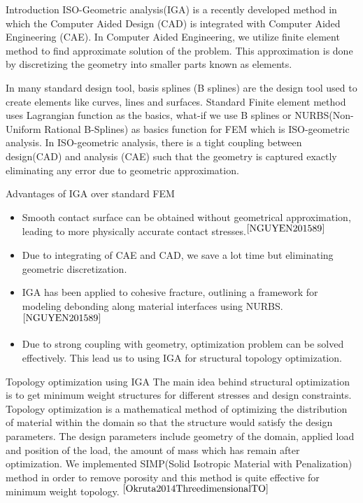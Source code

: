 \documentclass[a4paper,12pt,times]{article}
\begin{document}



\tableofcontents
\vfill
\newpage
\begin{section}{Introduction}
ISO-Geometric analysis(IGA) is a recently developed method in which the Computer Aided Design (CAD) is integrated with Computer Aided Engineering (CAE). In Computer Aided Engineering, we utilize finite element method to find approximate solution of the problem. This approximation is done by discretizing the geometry into smaller parts known as elements.

In many standard design tool, basis splines (B splines) are the design tool used to create elements like curves, lines and surfaces. Standard Finite element method uses Lagrangian function as the basics, what-if we use B splines or NURBS(Non-Uniform Rational B-Splines) as basics function for FEM which is ISO-geometric analysis. In ISO-geometric analysis, there is a tight coupling between design(CAD) and analysis (CAE) such that the geometry is captured exactly eliminating any error due to geometric approximation. 

\begin{subsection}{Advantages of IGA over standard FEM}
\begin{itemize}
\item Smooth contact surface can be obtained without geometrical approximation, leading to more physically accurate contact stresses.$^{\cite{NGUYEN201589}}$
  \item Due to integrating of CAE and CAD, we save a lot time but eliminating geometric discretization.
  
  \item IGA has been applied to cohesive fracture, outlining a framework for modeling debonding along material
interfaces using NURBS.$^{\cite{NGUYEN201589}}$
  
  \item Due to strong coupling with geometry, optimization problem can be solved effectively. This lead us to using IGA for structural topology optimization.
  
\end{itemize}
\end{subsection}

\begin{subsection}{Topology optimization using IGA}
The main idea behind structural optimization is to get minimum weight structures for different stresses and design constraints. Topology optimization is a mathematical method of optimizing the distribution of material within the domain so that the structure would satisfy the design parameters. The design parameters include geometry of the domain, applied load and position of the load, the amount of mass which has remain after optimization. We implemented SIMP(Solid Isotropic Material with Penalization) method in order to remove porosity and this method is quite effective for minimum weight topology. 
$^{\cite{Okruta2014ThreedimensionalTO}}$ 
\end{subsection}


\end{section}
\end{document}
